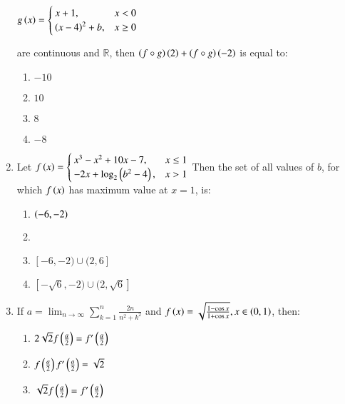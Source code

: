 \documentclass[journal]{IEEEtran}
\begin{document}
\begin{enumerate}
        $ g\left(x\right) = 
        \begin{cases}
            x+1 , &x<0 \\
            \left(x-4\right)^2 + b,&x\geq 0
        \end{cases}
        $
    
     are continuous and $\mathbb{R}$, then $\left(f \circ g\right)\left(2\right) + \left(f\circ g\right)\left(-2\right)$ is equal to:
    \begin{multicols}{2}
        \begin{enumerate}
            \item $-10$
            \item $10$
            \item $8$
            \item $-8$
        \end{enumerate}
    \end{multicols}
    \item Let $
        f\left(x\right) = 
            \begin{cases}
                x^3 - x^2 + 10x - 7, &x\leq 1 \\
                -2x + \log_{2} \left(b^2 - 4\right),&x>1
            \end{cases}
        $
        Then the set of all values of $b$, for which $f\left(x\right)$ has maximum value at $x=1$, is:
        \begin{multicols}{2}
            \begin{enumerate}
                \item $\left(-6,-2\right)$
                \item {}
                \item $[-6,-2)\cup(2,6]$
                \item $[-\sqrt{6},-2)\cup(2,\sqrt{6}]$
            \end{enumerate}
        \end{multicols}
        \item If $a = \lim_{n \to \infty} \sum_{k=1}^{n} \frac{2n}{n^2 + k^2}$ and $f\left(x\right) = \sqrt{\frac{1 - \cos{x}}{1 + \cos{x}}},x \in \left(0,1\right)$, then:
        \begin{multicols}{2}
            \begin{enumerate}
                \item $2\sqrt{2}f\left(\frac{a}{2}\right) = f^{\prime}\left(\frac{a}{2}\right)$
                \item $f\left(\frac{a}{2}\right) f^{\prime}\left(\frac{a}{2}\right) = \sqrt{2}$
                \item $\sqrt{2}f\left(\frac{a}{2}\right) = f^{\prime}\left(\frac{a}{2}\right)$

\end{enumerate}
\end{multicols}
\end{enumerate}
\end{document}

